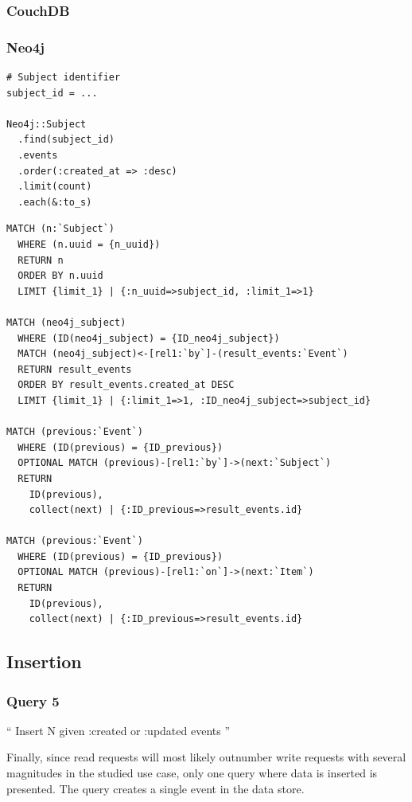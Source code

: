 \subsubsection*{CouchDB}


\subsubsection*{Neo4j}

\begin{verbatim}
# Subject identifier
subject_id = ...

Neo4j::Subject
  .find(subject_id)
  .events
  .order(:created_at => :desc)
  .limit(count)
  .each(&:to_s)
\end{verbatim}

\begin{verbatim}
MATCH (n:`Subject`)
  WHERE (n.uuid = {n_uuid})
  RETURN n
  ORDER BY n.uuid
  LIMIT {limit_1} | {:n_uuid=>subject_id, :limit_1=>1}

MATCH (neo4j_subject)
  WHERE (ID(neo4j_subject) = {ID_neo4j_subject})
  MATCH (neo4j_subject)<-[rel1:`by`]-(result_events:`Event`)
  RETURN result_events
  ORDER BY result_events.created_at DESC
  LIMIT {limit_1} | {:limit_1=>1, :ID_neo4j_subject=>subject_id}

MATCH (previous:`Event`)
  WHERE (ID(previous) = {ID_previous})
  OPTIONAL MATCH (previous)-[rel1:`by`]->(next:`Subject`)
  RETURN
    ID(previous),
    collect(next) | {:ID_previous=>result_events.id}

MATCH (previous:`Event`)
  WHERE (ID(previous) = {ID_previous})
  OPTIONAL MATCH (previous)-[rel1:`on`]->(next:`Item`)
  RETURN
    ID(previous),
    collect(next) | {:ID_previous=>result_events.id}
\end{verbatim}

\subsection{Insertion}
\label{subsec:insertion}

\subsubsection{Query 5}
\label{subsubsec:query-5}

``
Insert N given :created or :updated events
''

Finally, since read requests will most likely outnumber write requests with several magnitudes in the studied use case, only one query where data is inserted is presented.
The query creates a single event in the data store.

